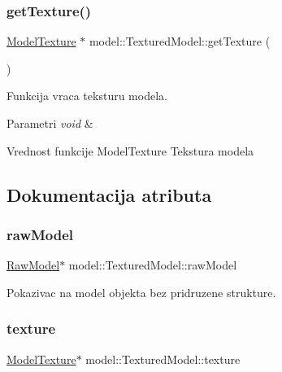 \subsubsection{\texorpdfstring{get\+Texture()}{getTexture()}}
{\footnotesize\ttfamily \hyperlink{classtexture_1_1ModelTexture}{Model\+Texture} $\ast$ model\+::\+Textured\+Model\+::get\+Texture (\begin{DoxyParamCaption}\item[{void}]{ }\end{DoxyParamCaption})}



Funkcija vraca teksturu modela. 


\begin{DoxyParams}{Parametri}
{\em void} & \\
\hline
\end{DoxyParams}
\begin{DoxyReturn}{Vrednost funkcije}
Model\+Texture Tekstura modela 
\end{DoxyReturn}


\subsection{Dokumentacija atributa}
\mbox{\label{classmodel_1_1TexturedModel_ac6157368c7e55a78aa02f9546f5f2dc3}} 
\subsubsection{\texorpdfstring{raw\+Model}{rawModel}}
{\footnotesize\ttfamily \hyperlink{classmodel_1_1RawModel}{Raw\+Model}$\ast$ model\+::\+Textured\+Model\+::raw\+Model\hspace{0.3cm}{\ttfamily [private]}}



Pokazivac na model objekta bez pridruzene strukture. 

\mbox{\label{classmodel_1_1TexturedModel_aad9aacee1ff02e44bd8ee9daff22f817}} 
\subsubsection{\texorpdfstring{texture}{texture}}
{\footnotesize\ttfamily \hyperlink{classtexture_1_1ModelTexture}{Model\+Texture}$\ast$ model\+::\+Textured\+Model\+::texture\hspace{0.3cm}{\ttfamily [private]}}



